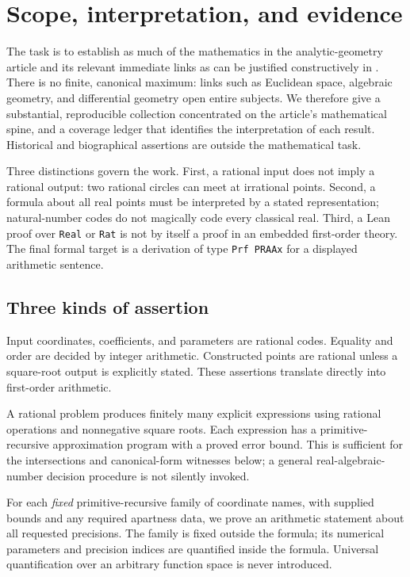 \section{Scope, interpretation, and evidence}
\label{sec:scope}

The task is to establish as much of the mathematics in the analytic-geometry article and its relevant immediate links as can be justified constructively in \ipra. There is no finite, canonical maximum: links such as Euclidean space, algebraic geometry, and differential geometry open entire subjects. We therefore give a substantial, reproducible collection concentrated on the article's mathematical spine, and a coverage ledger that identifies the interpretation of each result. Historical and biographical assertions are outside the mathematical task.

Three distinctions govern the work. First, a rational input does not imply a rational output: two rational circles can meet at irrational points. Second, a formula about all real points must be interpreted by a stated representation; natural-number codes do not magically code every classical real. Third, a Lean proof over \texttt{Real} or \texttt{Rat} is not by itself a proof in an embedded first-order theory. The final formal target is a derivation of type \texttt{Prf PRAAx} for a displayed arithmetic sentence.

\subsection{Three kinds of assertion}

\begin{description}[style=nextline]
\item[Exact rational assertions (E).]
Input coordinates, coefficients, and parameters are rational codes. Equality and order are decided by integer arithmetic. Constructed points are rational unless a square-root output is explicitly stated. These assertions translate directly into first-order arithmetic.
\item[Constructed algebraic outputs (A).]
A rational problem produces finitely many explicit expressions using rational operations and nonnegative square roots. Each expression has a primitive-recursive approximation program with a proved error bound. This is sufficient for the intersections and canonical-form witnesses below; a general real-algebraic-number decision procedure is not silently invoked.
\item[Represented-real schemas (R).]
For each \emph{fixed} primitive-recursive family of coordinate names, with supplied bounds and any required apartness data, we prove an arithmetic statement about all requested precisions. The family is fixed outside the formula; its numerical parameters and precision indices are quantified inside the formula. Universal quantification over an arbitrary function space is never introduced.
\end{description}

